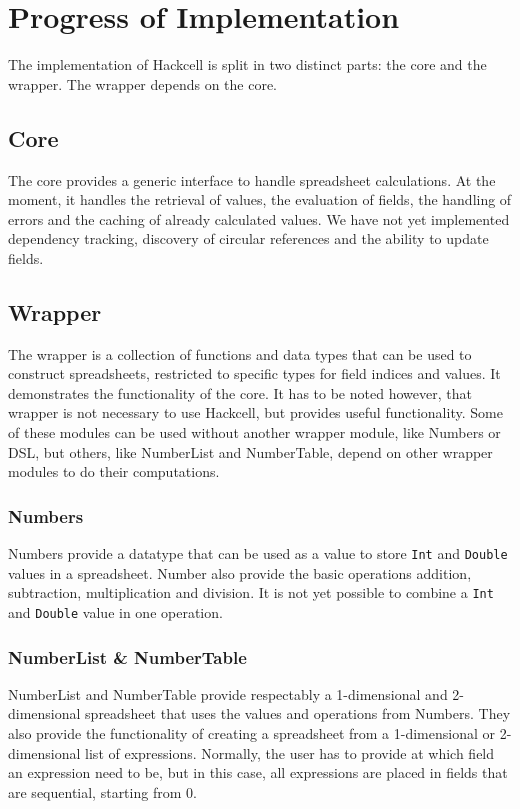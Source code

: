 \documentclass{article}
\begin{document}
	\section{Progress of Implementation}
	The implementation of Hackcell is split in two distinct parts: the core and the wrapper. The wrapper depends on the core.
	\subsection{Core}
	The core provides a generic interface to handle spreadsheet calculations. At the moment, it handles the retrieval of values, the evaluation of fields, the handling of errors and the caching of already calculated values.
	We have not yet implemented dependency tracking, discovery of circular references and the ability to update fields.

	\subsection{Wrapper}
	The wrapper is a collection of functions and data types that can be used to construct spreadsheets, restricted to specific types for field indices and values. It demonstrates the functionality of the core. It has to be noted however, that wrapper is not necessary to use Hackcell, but provides useful functionality. Some of these modules can be used without another wrapper module, like Numbers or DSL, but others, like NumberList and NumberTable, depend on other wrapper modules to do their computations.
	\subsubsection{Numbers}
	Numbers provide a datatype that can be used as a value to store \texttt{Int} and \texttt{Double} values in a spreadsheet. Number also provide the basic operations addition, subtraction, multiplication and division. It is not yet possible to combine a \texttt{Int} and \texttt{Double} value in one operation.
	\subsubsection{NumberList \& NumberTable}	
	NumberList and NumberTable provide respectably a 1-dimensional and 2-dimensional spreadsheet that uses the values and operations from Numbers. They also provide the functionality of creating a spreadsheet from a 1-dimensional or 2-dimensional list of expressions. Normally, the user has to provide at which field an expression need to be, but in this case, all expressions are placed in fields that are sequential, starting from 0.
\end{document}
